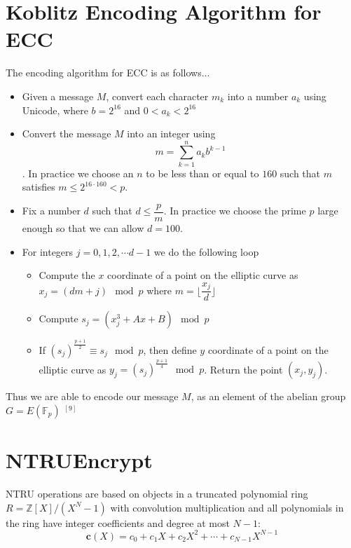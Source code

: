 \documentclass[cryptography,article,submit,moreauthors,pdftex]{Definitions/mdpi}
\begin{document}
\section{Koblitz Encoding Algorithm for ECC}
\begin{flushleft}
	The encoding algorithm for ECC is as follows...\\
	\begin{itemize}
		\item Given a message $M$, convert each character $m_k$ into a number $a_k$ using Unicode, where $b=2^{16}$ and $0<a_k<2^{16}$
		\item Convert the message $M$ into an integer using $$m=\sum_{k=1}^n a_kb^{k-1}$$. In practice we choose an $n$ to be less than or equal to $160$ such that $m$ satisfies $m\le 2^{16\cdot 160}<p$.
		\item Fix a number $d$ such that $d\le \dfrac{p}{m}$. In practice we choose the prime $p$ large enough so that we can allow $d=100$.
		\item For integers $j=0,1,2,\cdots d-1$  we do the following loop
		\begin{itemize}
			\item Compute the $x$ coordinate of a point on the elliptic curve as $x_j=(dm+j)\mod p$ where $m=\bigg\lfloor{\dfrac{x_j}{d}}\bigg\rfloor$
			\item Compute $s_j=(x_j^3+Ax+B)\mod p$
			\item If $\left(s_j\right)^{\frac{p+1}{2}}\equiv s_j\mod p$, then define $y$ coordinate of a point on the elliptic curve as $y_j=\left(s_j\right)^{\frac{p+1}{4}}\mod p$. Return the point $(x_j,y_j)$.
		\end{itemize}
	\end{itemize}
	
	Thus we are able to encode our message $M$, as an element of the abelian group $G=E\left(\mathbb{F}_p\right)$ $^{[9]}$
\end{flushleft}

\section{NTRUEncrypt}
NTRU operations are based on objects in a truncated polynomial ring $R=\mathbb{Z}[X]/(X^N-1)$ with convolution multiplication and all polynomials in the ring have integer coefficients and degree at most $N-1$:
\begin{equation}
    \textbf{c}(X)=c_0+c_1X+c_2X^2+\cdots+c_{N-1}X^{N-1}
\end{equation}
\end{document}
